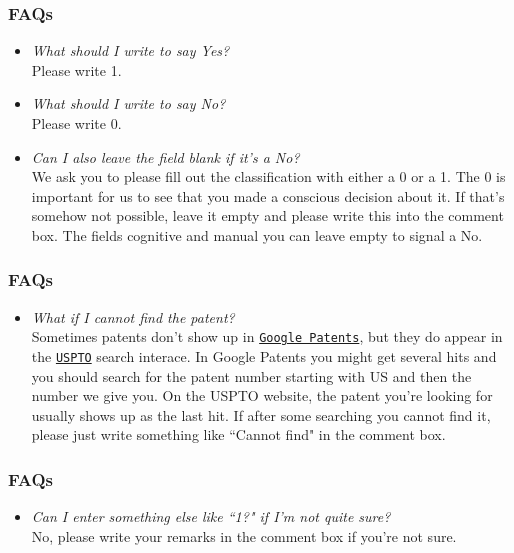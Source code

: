 \documentclass[10pt]{beamer}
\begin{document}
\begin{frame}\frametitle{FAQs}
	\begin{itemize}	
	\item \textit{What should I write to say Yes?}\\[0.1cm]
	Please write 1.
	\item \textit{What should I write to say No?}\\[0.1cm]
	Please write 0.
	\item \textit{Can I also leave the field blank if it's a No?}\\[0.1cm]
	We ask you to please fill out the classification with either a 0 or a 1. The 0 is important for us to see that you made a conscious decision about it. If that's somehow not possible, leave it empty and please write this into the comment box. The fields cognitive and manual you can leave empty to signal a No.
		\end{itemize}
\end{frame}


\begin{frame}\frametitle{FAQs}
	\begin{itemize}	
	\item \textit{What if I cannot find the patent?}\\[0.1cm]
Sometimes patents don't show up in \href{https://www.google.com/patents}{\texttt{Google Patents}}, but they do appear in the \href{http://patft.uspto.gov/netahtml/PTO/search-bool.html}{\texttt{USPTO}} search interace. In Google Patents you might get several hits and you should search for the patent number starting with US and then the number we give you. On the USPTO website, the patent you're looking for usually shows up as the last hit. If after some searching you cannot find it, please just write something like ``Cannot find" in the comment box.
	\end{itemize}
\end{frame}


\begin{frame}\frametitle{FAQs}
	\begin{itemize}	
	\item \textit{Can I enter something else like ``1?" if I'm not quite sure?}\\[0.1cm]
	No, please write your remarks in the comment box if you're not sure. 
	\end{itemize}
\end{frame}
\end{document}
